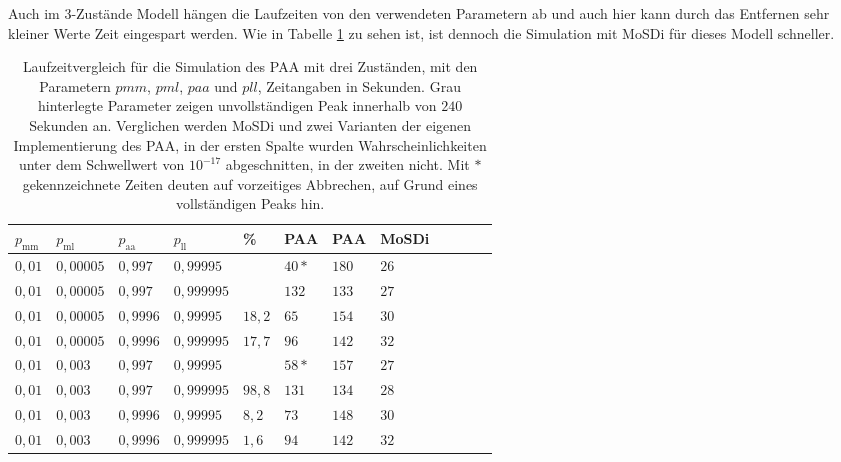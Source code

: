 Auch im 3-Zustände Modell hängen die Laufzeiten von den verwendeten Parametern ab und auch hier kann durch das Entfernen sehr kleiner Werte Zeit eingespart werden. Wie in Tabelle \ref{3s_laufzeit_paa} zu sehen ist, ist dennoch die Simulation mit MoSDi für dieses Modell schneller.

\begin{table}[h]
\centering 
\caption[Laufzeitvergleich für die Simulation des PAA mit drei Zuständen]{Laufzeitvergleich für die Simulation des PAA mit drei Zuständen, mit den Parametern $pmm$, $pml$, $paa$ und $pll$, Zeitangaben in Sekunden. Grau hinterlegte Parameter zeigen unvollständigen Peak innerhalb von $240$ Sekunden an. Verglichen werden MoSDi und zwei Varianten der eigenen Implementierung des PAA, in der ersten Spalte wurden Wahrscheinlichkeiten unter dem Schwellwert von $10^{-17}$ abgeschnitten, in der zweiten nicht. Mit $*$ gekennzeichnete Zeiten deuten auf vorzeitiges Abbrechen, auf Grund eines vollständigen Peaks hin.}
\label{3s_laufzeit_paa}
\begin{tabular}{|l|l|l|l||l||l|l|l|l|l|l|l|}
\hline
$p_\text{mm}$ & $p_\text{ml}$ & $p_\text{aa}$ & $p_\text{ll}$ & \% & PAA & PAA & MoSDi \\ \hline \hline
$ 0,01 $ & $0,00005$ & $0,997$  & $0,99995$  &&  $40* $ & $180  $ & $26 $  \\ \hline
$ 0,01 $ & $0,00005$ & $0,997$  & $0,999995$ &&  $132  $ & $133  $ & $27 $  \\ \hline
\cellcolor{gray!25}$ 0,01 $ & \cellcolor{gray!25}$0,00005$ & \cellcolor{gray!25}$0,9996$ & \cellcolor{gray!25}$0,99995$  &$18,2$& $65 $ & $154  $ & $30 $  \\ \hline
\cellcolor{gray!25}$ 0,01 $ & \cellcolor{gray!25}$0,00005$ & \cellcolor{gray!25}$0,9996$ & \cellcolor{gray!25}$0,999995$ &$17,7$& $96 $ & $142  $ & $ 32 $  \\ \hline
$ 0,01 $ & $0,003 $  & $0,997$  & $0,99995$  &&  $58*  $ & $157  $ & $27 $  \\ \hline
\cellcolor{gray!25}$ 0,01 $ & \cellcolor{gray!25}\cellcolor{gray!25}$0,003 $  & \cellcolor{gray!25}$0,997$  & \cellcolor{gray!25}$0,999995$ &$98,8$&$131  $ & $134  $ & $ 28 $  \\ \hline
\cellcolor{gray!25}$ 0,01 $ & \cellcolor{gray!25}$0,003 $  & \cellcolor{gray!25}\cellcolor{gray!25}$0,9996$ & \cellcolor{gray!25}$0,99995$  &$8,2$& $73  $ & $148  $ & $ 30  $  \\ \hline
\cellcolor{gray!25}$ 0,01 $ & \cellcolor{gray!25}$0,003 $  & \cellcolor{gray!25}\cellcolor{gray!25}$0,9996$ & \cellcolor{gray!25}$0,999995$ &$1,6$& $94  $ & $142  $ & $32 $  \\ \hline

\end{tabular}
\end{table}
